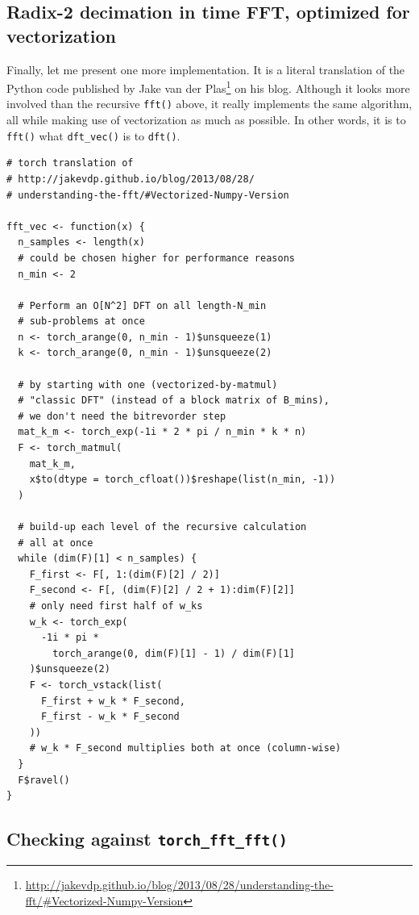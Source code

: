 \documentclass[
  letterpaper,
]{krantz}
\DeclareRobustCommand{\href}[2]{#2\footnote{\url{#1}}}
\begin{document}
\hypertarget{radix-2-decimation-in-time-fft-optimized-for-vectorization}{%
\subsection{Radix-2 decimation in time FFT, optimized for
vectorization}\label{radix-2-decimation-in-time-fft-optimized-for-vectorization}}

Finally, let me present one more implementation. It is a literal
translation of the Python code published by
\href{http://jakevdp.github.io/blog/2013/08/28/understanding-the-fft/\#Vectorized-Numpy-Version}{Jake
van der Plas} on his blog. Although it looks more involved than the
recursive \texttt{fft()} above, it really implements the same algorithm,
all while making use of vectorization as much as possible. In other
words, it is to \texttt{fft()} what \texttt{dft\_vec()} is to
\texttt{dft()}.

\begin{verbatim}
# torch translation of
# http://jakevdp.github.io/blog/2013/08/28/
# understanding-the-fft/#Vectorized-Numpy-Version

fft_vec <- function(x) {
  n_samples <- length(x)
  # could be chosen higher for performance reasons
  n_min <- 2 

  # Perform an O[N^2] DFT on all length-N_min 
  # sub-problems at once
  n <- torch_arange(0, n_min - 1)$unsqueeze(1)
  k <- torch_arange(0, n_min - 1)$unsqueeze(2)

  # by starting with one (vectorized-by-matmul)
  # "classic DFT" (instead of a block matrix of B_mins),
  # we don't need the bitrevorder step
  mat_k_m <- torch_exp(-1i * 2 * pi / n_min * k * n)
  F <- torch_matmul(
    mat_k_m,
    x$to(dtype = torch_cfloat())$reshape(list(n_min, -1))
  )

  # build-up each level of the recursive calculation
  # all at once
  while (dim(F)[1] < n_samples) {
    F_first <- F[, 1:(dim(F)[2] / 2)]
    F_second <- F[, (dim(F)[2] / 2 + 1):dim(F)[2]]
    # only need first half of w_ks
    w_k <- torch_exp(
      -1i * pi *
        torch_arange(0, dim(F)[1] - 1) / dim(F)[1]
    )$unsqueeze(2)
    F <- torch_vstack(list(
      F_first + w_k * F_second,
      F_first - w_k * F_second
    ))
    # w_k * F_second multiplies both at once (column-wise)
  }
  F$ravel()
}
\end{verbatim}

\hypertarget{checking-against-torch_fft_fft}{%
\subsection{\texorpdfstring{Checking against
\texttt{torch\_fft\_fft()}}{Checking against torch\_fft\_fft()}}\label{checking-against-torch_fft_fft}}
\end{document}
